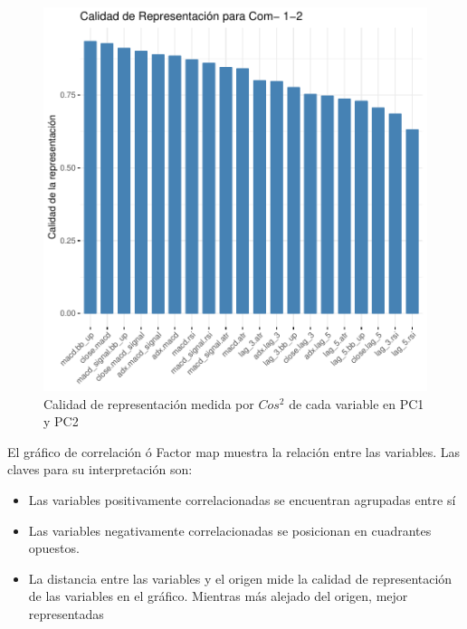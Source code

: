 \documentclass[a4paper,12pt]{Latex/Classes/PhDthesisPSnPDF}
\begin{document}
\begin{figure}[H]
\centering
\includegraphics{main-015}
\caption{Calidad de representación medida por $Cos^2$ de cada variable en PC1 y PC2}
\end{figure}

El gráfico de correlación ó Factor map muestra la relación entre las variables. Las claves para su interpretación son:

\begin{itemize}
\item Las variables positivamente correlacionadas se encuentran agrupadas entre sí
\item Las variables negativamente correlacionadas se posicionan en cuadrantes opuestos.
\item La distancia entre las variables y el origen mide la calidad de representación de las variables en el gráfico. Mientras más alejado del origen, mejor representadas 
\end{itemize}
\end{document}
